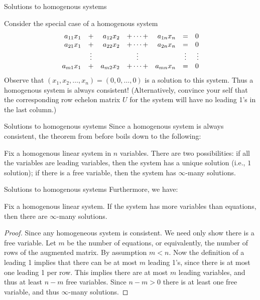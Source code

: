 \begin{frame}{Solutions to homogenous systems}

Consider the special case of a homogenous system
\[
\begin{array}{rcrcrcr} a_{11}x_{1}&+&a_{12}x_{2}&+\cdots+& a_{1n}x_{n}&=&0\\ a_{21}x_{1}&+&a_{22}x_{2}&+\cdots+&a_{2n}x_{n}&=&0\\ &\vdots& &\vdots & &\vdots & \vdots\\ a_{m1}x_{1}&+&a_{m2}x_{2}&+\cdots +&a_{mn}x_{n}&=&0 \end{array}
\]
\pause Observe that $(x_1,x_2,\dots, x_n)=(0,0,\dots, 0)$ is a solution to this system. Thus a homogenous system is always consistent! \bpause (Alternatively, convince your self that the corresponding row echelon matrix $U$ for the system will have no leading 1's in the last column.) 
\end{frame}
\begin{frame}{Solutions to homogenous systems}
Since a homogenous system is always consistent, the theorem from before boils down to the following: 
\begin{corollary}
Fix a \alert{homogenous} linear system in $n$ variables. There are two possibilities:
\bb
\ii if all the variables are leading variables, then the system has a unique solution (i.e., $\boxed{1}$ solution);
\ii if there is a free variable, then the system has $\boxed{\infty}$-many solutions.  
\ee
\end{corollary}
\end{frame}
\begin{frame}{Solutions to homogenous systems}
Furthermore, we have:
\begin{corollary}
Fix a homogenous linear system. If the system has more variables than equations, then there are $\infty$-many solutions. 
\end{corollary}
\pause
\begin{proof}
Since any homogeneous system is consistent. We need only show there is a free variable. 
\bpause Let $m$ be the number of equations, or equivalently, the number of rows of the augmented matrix. 
By assumption $m<n$. 
\bpause Now the definition of a leading 1 implies that there can be \alert{at most} $m$ leading 1's, since there is at most one leading 1 per row.
\bpause This implies there are at most $m$ leading variables, and thus at least $n-m$ free variables. Since $n-m>0$ there is at least one free variable, and thus $\infty$-many solutions.   
\end{proof}
\end{frame}